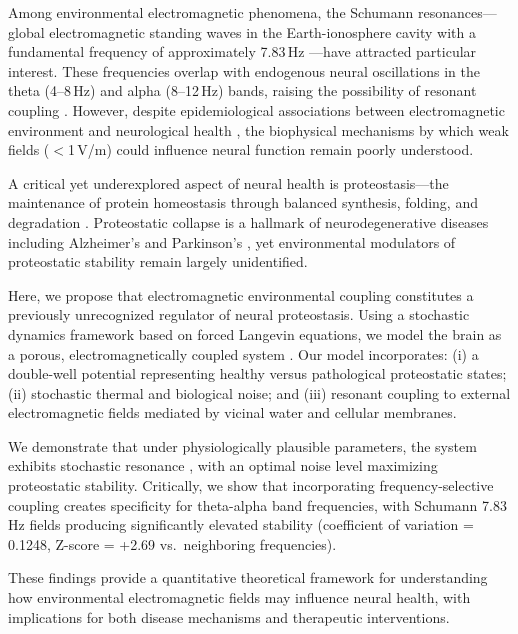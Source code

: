 \documentclass[10pt,a4paper]{article}
\begin{document}
Among environmental electromagnetic phenomena, the Schumann resonances---global 
electromagnetic standing waves in the Earth-ionosphere cavity with a fundamental 
frequency of approximately 7.83\,Hz \citep{schumann1952uber, williams2009schumann}---have 
attracted particular interest. These frequencies overlap with endogenous neural oscillations 
in the theta (4--8\,Hz) and alpha (8--12\,Hz) bands, raising the possibility of resonant 
coupling \citep{buzsaki2006rhythms, klimesch2012alpha}. However, despite epidemiological 
associations between electromagnetic environment and neurological health \citep{havas2006electromagnetic}, 
the biophysical mechanisms by which weak fields ($<$1\,V/m) could influence neural 
function remain poorly understood.

A critical yet underexplored aspect of neural health is proteostasis---the maintenance 
of protein homeostasis through balanced synthesis, folding, and degradation \citep{balch2008adapting, 
hipp2019proteostasis}. Proteostatic collapse is a hallmark of neurodegenerative diseases 
including Alzheimer's and Parkinson's \citep{soto2012protein, knowles2014protein}, yet 
environmental modulators of proteostatic stability remain largely unidentified.

Here, we propose that electromagnetic environmental coupling constitutes a previously 
unrecognized regulator of neural proteostasis. Using a stochastic dynamics framework 
based on forced Langevin equations, we model the brain as a porous, electromagnetically 
coupled system \citep{cavaglia2023porous, firaux2024dynamic}. Our model incorporates: 
(i) a double-well potential representing healthy versus pathological proteostatic states; 
(ii) stochastic thermal and biological noise; and (iii) resonant coupling to external 
electromagnetic fields mediated by vicinal water and cellular membranes.

We demonstrate that under physiologically plausible parameters, the system exhibits 
stochastic resonance \citep{gammaitoni1998stochastic, mcdonnell2008stochastic}, with 
an optimal noise level maximizing proteostatic stability. Critically, we show that 
incorporating frequency-selective coupling creates specificity for theta-alpha band 
frequencies, with Schumann 7.83\,Hz fields producing significantly elevated stability 
(coefficient of variation = 0.1248, Z-score = +2.69 vs.\ neighboring frequencies).

These findings provide a quantitative theoretical framework for understanding how 
environmental electromagnetic fields may influence neural health, with implications 
for both disease mechanisms and therapeutic interventions.
\end{document}
